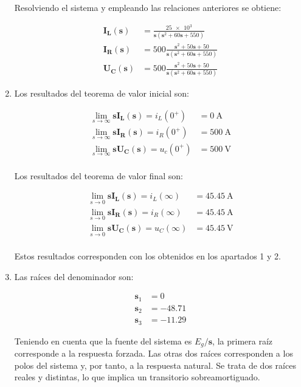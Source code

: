 \documentclass[12pt]{article}
\newcommand{\laplace}[1]{\mathbf{#1}(\mathbf{s})}
\newcommand{\slp}{\mathbf{s}}
\begin{document}
\begin{enumerate}
  Resolviendo el sistema y empleando las relaciones anteriores se obtiene:

  \begin{align*}
    \laplace{I_L} &= \frac{\num{25e3}}{\slp(\slp^2 + 60\slp + 550)}\\
    \laplace{I_R} &= 500 \frac{\slp^2 + 50\slp + 50}{\slp(\slp^2 + 60\slp + 550)}\\
    \laplace{U_C} &= 500 \frac{\slp^2 + 50 \slp + 50}{\slp(\slp^2 + 60\slp + 550)}
  \end{align*}



\item

  Los resultados del teorema de valor inicial son:

  \begin{align*}
    \lim_{s \to \infty} \slp \laplace{I_L} = i_L(0^+) &= \SI{0}{\ampere}\\
    \lim_{s \to \infty} \slp \laplace{I_R} = i_R(0^+) &= \SI{500}{\ampere}\\
    \lim_{s \to \infty} \slp \laplace{U_C} = u_c(0^+) &= \SI{500}{\volt}\\
  \end{align*}

  Los resultados del teorema de valor final son:

  \begin{align*}
    \lim_{s \to 0} \slp \laplace{I_L} = i_L(\infty) &= \SI{45.45}{\ampere}\\
    \lim_{s \to 0} \slp \laplace{I_R} = i_R(\infty) &= \SI{45.45}{\ampere}\\
    \lim_{s \to 0} \slp \laplace{U_C} = u_C(\infty) &= \SI{45.45}{\volt}\\
  \end{align*}

  Estos resultados corresponden con los obtenidos en los apartados 1 y 2.
\item

  Las raíces del denominador son:

  \begin{align*}
    \slp_1 &= 0\\
    \slp_2 &= -48.71\\
    \slp_3 &= -11.29
  \end{align*}

  Teniendo en cuenta que la fuente del sistema es $E_g/\slp$, la primera raíz corresponde a la respuesta forzada. Las otras dos raíces corresponden a los polos del sistema y, por tanto, a la respuesta natural. Se trata de dos raíces reales y distintas, lo que implica un transitorio sobreamortiguado.


\end{enumerate}
\end{document}
